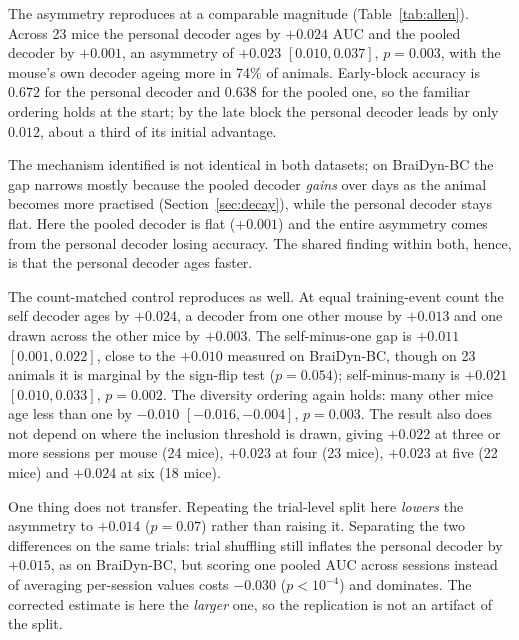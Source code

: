 \documentclass{article}
\newcommand{\auc}{\mathrm{AUC}}
\begin{document}
The asymmetry reproduces at a comparable magnitude (Table~\ref{tab:allen}). Across 23 mice the
personal decoder ages by $+0.024$ $\auc$ and the pooled decoder by $+0.001$, an asymmetry of
$+0.023$ $[0.010, 0.037]$, $p = 0.003$, with the mouse's own decoder ageing more in 74\% of animals.
Early-block accuracy is $0.672$ for the personal decoder and $0.638$ for the pooled one, so the
familiar ordering holds at the start; by the late block the personal decoder leads by only $0.012$,
about a third of its initial advantage.

The mechanism identified is not identical in both datasets; on BraiDyn-BC the gap narrows
mostly because the pooled decoder \emph{gains} over days as the animal becomes more practised
(Section~\ref{sec:decay}), while the personal decoder stays flat. Here the pooled decoder is flat
($+0.001$) and the entire asymmetry comes from the personal decoder losing accuracy. The shared
finding within both, hence, is that the personal decoder ages faster.

The count-matched control reproduces as well. At equal training-event count the self decoder ages
by $+0.024$, a decoder from one other mouse by $+0.013$ and one drawn across the other mice by
$+0.003$. The self-minus-one gap is $+0.011$ $[0.001, 0.022]$, close to the $+0.010$ measured on
BraiDyn-BC, though on 23 animals it is marginal by the sign-flip test ($p = 0.054$); self-minus-many
is $+0.021$ $[0.010, 0.033]$, $p = 0.002$. The diversity ordering again holds: many other mice age
less than one by $-0.010$ $[-0.016, -0.004]$, $p = 0.003$.
The result also does not depend on where the inclusion threshold is drawn, giving $+0.022$ at three
or more sessions per mouse (24 mice), $+0.023$ at four (23 mice), $+0.023$ at five (22 mice) and
$+0.024$ at six (18 mice).

One thing does not transfer. Repeating the trial-level split here \emph{lowers} the asymmetry to
$+0.014$ ($p = 0.07$) rather than raising it. Separating the two differences on the same trials:
trial shuffling still inflates the personal decoder by $+0.015$, as on BraiDyn-BC, but scoring one
pooled $\auc$ across sessions instead of averaging per-session values costs $-0.030$
($p < 10^{-4}$) and dominates. The corrected estimate is here the \emph{larger} one, so the
replication is not an artifact of the split.
\end{document}

